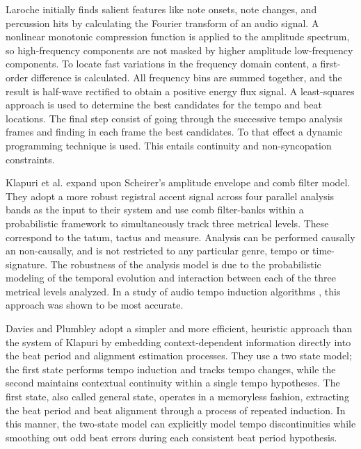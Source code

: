 \documentclass{scrartcl}
\begin{document}

Laroche \cite{Laroche2003} initially finds salient features like note onsets, note changes, and percussion hits by calculating the Fourier transform of an audio signal. A nonlinear monotonic compression function is applied to the amplitude spectrum, so high-frequency components are not masked by higher amplitude low-frequency components. To locate fast variations in the frequency domain content, a first-order difference is calculated. All frequency bins are summed together, and the result is half-wave rectified to obtain a positive energy flux signal. A least-squares approach is used to determine the best candidates for the tempo and beat locations. The final step consist of going through the successive tempo analysis frames and finding in each frame the best candidates. To that effect a dynamic programming technique is used. This entails continuity and non-syncopation constraints. 

Klapuri et al. \cite{Klapuri2005} expand upon Scheirer's amplitude envelope and comb filter model. They adopt a more robust registral accent signal across four parallel analysis bands as the input to their system and use comb filter-banks within a probabilistic framework to simultaneously track three metrical levels. These correspond to the tatum, tactus and measure. Analysis can be performed causally an non-causally, and is not restricted to any particular genre, tempo or time-signature. The robustness of the analysis model is due to the probabilistic modeling of the temporal evolution and interaction between each of the three metrical levels analyzed. In a study of audio tempo induction algorithms \cite{Gouyon2006b}, this approach was shown to be most accurate.

Davies and Plumbley \cite{Davies2007} adopt a simpler and more efficient, heuristic approach than the system of Klapuri by embedding context-dependent information directly into the beat period and alignment estimation processes. They use a two state model; the first state performs tempo induction and tracks tempo changes, while the second maintains contextual continuity within a single tempo hypotheses. The first state, also called general state, operates in a memoryless fashion, extracting the beat period and beat alignment through a process of repeated induction. In this manner, the two-state model can explicitly model tempo discontinuities while smoothing out odd beat errors during each consistent beat period hypothesis. 
\end{document}
